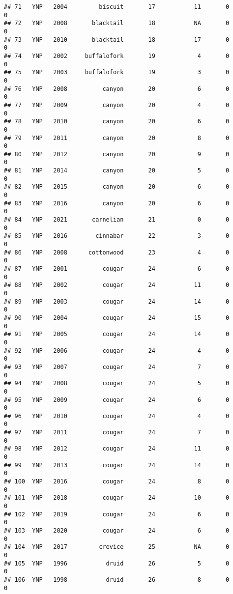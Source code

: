 \documentclass[
]{article}
\begin{document}
\begin{verbatim}
## 71   YNP   2004         biscuit       17           11       0        0
## 72   YNP   2008       blacktail       18           NA       0        0
## 73   YNP   2010       blacktail       18           17       0        0
## 74   YNP   2002     buffalofork       19            4       0        0
## 75   YNP   2003     buffalofork       19            3       0        0
## 76   YNP   2008          canyon       20            6       0        0
## 77   YNP   2009          canyon       20            4       0        0
## 78   YNP   2010          canyon       20            6       0        0
## 79   YNP   2011          canyon       20            8       0        0
## 80   YNP   2012          canyon       20            9       0        0
## 81   YNP   2014          canyon       20            5       0        0
## 82   YNP   2015          canyon       20            6       0        0
## 83   YNP   2016          canyon       20            6       0        0
## 84   YNP   2021       carnelian       21            0       0        0
## 85   YNP   2016        cinnabar       22            3       0        0
## 86   YNP   2008      cottonwood       23            4       0        0
## 87   YNP   2001          cougar       24            6       0        0
## 88   YNP   2002          cougar       24           11       0        0
## 89   YNP   2003          cougar       24           14       0        0
## 90   YNP   2004          cougar       24           15       0        0
## 91   YNP   2005          cougar       24           14       0        0
## 92   YNP   2006          cougar       24            4       0        0
## 93   YNP   2007          cougar       24            7       0        0
## 94   YNP   2008          cougar       24            5       0        0
## 95   YNP   2009          cougar       24            6       0        0
## 96   YNP   2010          cougar       24            4       0        0
## 97   YNP   2011          cougar       24            7       0        0
## 98   YNP   2012          cougar       24           11       0        0
## 99   YNP   2013          cougar       24           14       0        0
## 100  YNP   2016          cougar       24            8       0        0
## 101  YNP   2018          cougar       24           10       0        0
## 102  YNP   2019          cougar       24            6       0        0
## 103  YNP   2020          cougar       24            6       0        0
## 104  YNP   2017         crevice       25           NA       0        0
## 105  YNP   1996           druid       26            5       0        0
## 106  YNP   1998           druid       26            8       0        0

\end{verbatim}
\end{document}
